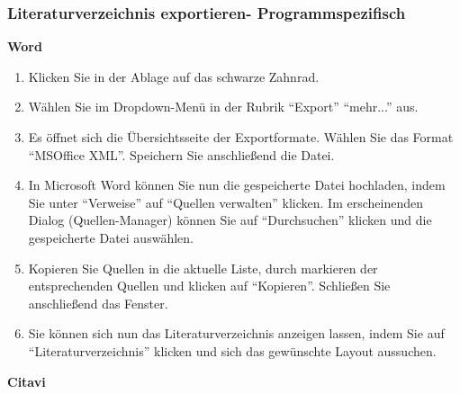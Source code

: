 \subsubsection{Literaturverzeichnis exportieren- Programmspezifisch}
\textbf{Word} 
\begin{enumerate}
    \item Klicken Sie in der Ablage auf das schwarze Zahnrad.
    \item Wählen Sie im Dropdown-Menü in der Rubrik \enquote{Export} \enquote{mehr...} aus.
    \item Es öffnet sich die Übersichtsseite der Exportformate. Wählen Sie das Format \enquote{MSOffice XML}. Speichern Sie anschließend die Datei.
    \item In Microsoft Word können Sie nun die gespeicherte Datei hochladen, indem Sie unter \enquote{Verweise} auf \enquote{Quellen verwalten} klicken. Im erscheinenden Dialog (Quellen-Manager) können Sie auf \enquote{Durchsuchen} klicken und die gespeicherte Datei auswählen. 
    \item Kopieren Sie Quellen in die aktuelle Liste, durch markieren der entsprechenden Quellen und klicken auf \enquote{Kopieren}. Schließen Sie anschließend das Fenster.
    \item Sie können sich nun das Literaturverzeichnis anzeigen lassen, indem Sie auf \enquote{Literaturverzeichnis} klicken und sich das gewünschte Layout aussuchen.
\end{enumerate}
\textbf{Citavi}
